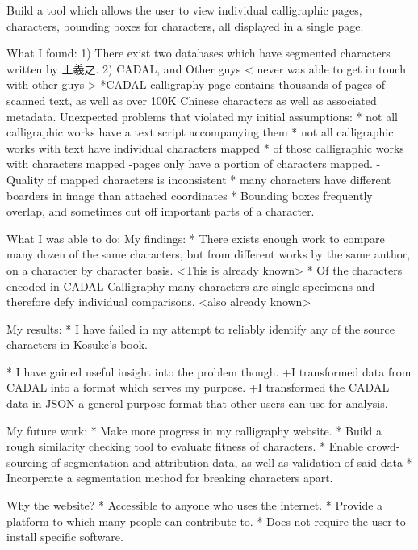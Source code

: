         Build a tool which allows the user to view individual calligraphic pages, characters, bounding boxes for characters, all displayed in a single page.
    
What I found:
    1)  There exist two databases which have segmented characters written by 王羲之.
    2)  CADAL, and Other guys < never was able to get in touch with other guys >
        *CADAL calligraphy page contains thousands of pages of scanned text, as well as over 100K Chinese characters as well as associated metadata.
    Unexpected problems that violated my initial assumptions:
        * not all calligraphic works have a text script accompanying them
        * not all calligraphic works with text have individual characters mapped
        * of those calligraphic works with characters mapped
            -pages only have a portion of characters mapped.
            -Quality of mapped characters is inconsistent
                * many characters have different boarders in image than attached coordinates
                * Bounding boxes frequently overlap, and sometimes cut off important parts of a character.

What I was able to do:
    My findings:
        * There exists enough work to compare many dozen of the same characters, but from different works by the same author, on a character by character basis. <This is already known>
        *  Of the characters encoded in CADAL Calligraphy many characters are single specimens and therefore defy individual comparisons.  <also already known>
    
    My results:
        *  I have failed in my attempt to reliably identify any of the source characters in Kosuke's book.
        
        *  I have gained useful insight into the problem though.
            +I transformed data from CADAL into a format which serves my purpose.
            +I transformed the CADAL data in JSON a general-purpose format that other users can use for analysis.
            
    My future work:
        *  Make more progress in my calligraphy website.
        *  Build a rough similarity checking tool to evaluate fitness of characters.
        *  Enable crowd-sourcing of segmentation and attribution data, as well as validation of said data
        *  Incorperate a segmentation method for breaking characters apart.


Why the website?
    * Accessible to anyone who uses the internet.
    * Provide  a platform to which many people can contribute to.
    * Does not require the user to install specific software.



